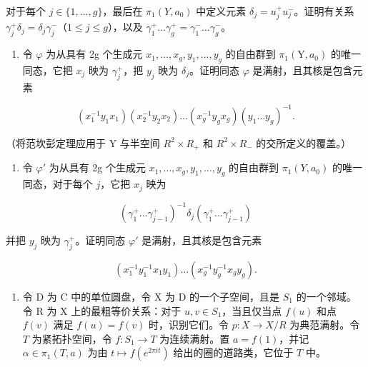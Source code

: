 对于每个 \(j \in \{1, \ldots, g\}\)，最后在 \(\pi_1(Y, a_0)\) 中定义元素 \(\delta_j = u_j^+ u_j^-\)。证明有关系 \(\gamma_j^+ \delta_j = \delta_j \gamma_j^-\)（\(1 \leqslant j \leqslant g\)），以及 \(\gamma_1^+ \ldots \gamma_g^+ = \gamma_1^- \ldots \gamma_g^-\)。

\begin{enumerate}
\def\labelenumi{\alph{enumi})}
\setcounter{enumi}{3}
\tightlist
\item
  令 \(\varphi\) 为从具有 2g 个生成元 \(x_{1},\ldots ,x_{g},y_{1},\ldots ,y_{g}\) 的自由群到 \(\pi_1(\mathrm{Y},a_0)\) 的唯一同态，它把 \(x_{j}\) 映为 \(\gamma_j^+\)，把 \(y_{j}\) 映为 \(\delta_{j}\)。证明同态 \(\varphi\) 是满射，且其核是包含元素
\end{enumerate}

\[
(x _ {1} ^ {- 1} y _ {1} x _ {1}) (x _ {2} ^ {- 1} y _ {2} x _ {2}) \dots (x _ {g} ^ {- 1} y _ {g} x _ {g}) (y _ {1} \dots y _ {g}) ^ {- 1}.
\]

（将范坎彭定理应用于 Y 与半空间 \(R^{2} \times R_{+}\) 和 \(R^{2} \times R_{-}\) 的交所定义的覆盖。）

\begin{enumerate}
\def\labelenumi{\alph{enumi})}
\setcounter{enumi}{4}
\tightlist
\item
  令 \(\varphi'\) 为从具有 2g 个生成元 \(x_1, \ldots, x_g, y_1, \ldots, y_g\) 的自由群到 \(\pi_1(Y, a_0)\) 的唯一同态，对于每个 \(j\)，它把 \(x_j\) 映为
\end{enumerate}

\[
(\gamma_ {1} ^ {+} \dots \gamma_ {j - 1} ^ {+}) ^ {- 1} \delta_ {j} (\gamma_ {1} ^ {+} \dots \gamma_ {j - 1} ^ {+})
\]

并把 \(y_{j}\) 映为 \(\gamma_{j}^{+}\)。证明同态 \(\varphi'\) 是满射，且其核是包含元素

\[
\left(x _ {1} ^ {- 1} y _ {1} ^ {- 1} x _ {1} y _ {1}\right) \dots \left(x _ {g} ^ {- 1} y _ {g} ^ {- 1} x _ {g} y _ {g}\right).
\]

\begin{enumerate}
\def\labelenumi{\arabic{enumi})}
\setcounter{enumi}{26}
\tightlist
\item
  令 D 为 C 中的单位圆盘，令 X 为 D 的一个子空间，且是 \(S_{1}\) 的一个邻域。令 R 为 X 上的最粗等价关系：对于 \(u, v \in S_{1}\)，当且仅当点 \(f(u)\) 和点 \(f(v)\) 满足 \(f(u) = f(v)\) 时，识别它们。令 \(p\colon X \to X / R\) 为典范满射。令 \(T\) 为紧拓扑空间，令 \(f\colon S_1 \to T\) 为连续满射。置 \(a = f(1)\)，并记 \(\alpha \in \pi_1(T, a)\) 为由 \(t \mapsto f(e^{2\pi it})\) 给出的圈的道路类，它位于 \(T\) 中。
\end{enumerate}


